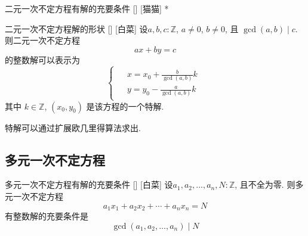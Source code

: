 \documentclass[UTF8]{ctexart}
\begin{document}
            \begin{thm}
                []
                {二元一次不定方程有解的充要条件}
                []
                [猫猫]
                *
            \end{thm}
            
            \begin{thm}
                [typeofsolutionoflinearDiophantineEquation]
                {二元一次不定方程解的形状}
                []
                [白菜]
                设\(a, b, c:\mathbb{Z}\), \(a\neq 0\), \(b\neq 0\), 且 \(\gcd(a,b)\mid c\). 则二元一次不定方程
                \[ax+by=c\]
                的整数解可以表示为
                \[
                    \begin{cases}
                    \begin{aligned}
                        &x=x_0+\frac{b}{\gcd(a,b)}k\\
                        &y=y_0-\frac{a}{\gcd(a,b)}k
                    \end{aligned}
                    \end{cases}         
                \]
                其中 \(k\in\mathbb{Z}\), \((x_0, y_0)\) 是该方程的一个特解.                    
                
            \end{thm}

            \begin{rmk}
                    特解可以通过扩展欧几里得算法求出.
            \end{rmk}

        \subsection{多元一次不定方程}
            
            \begin{thm}
                [conditionofsolvabilityofmultivariablelineardiophantineequation]
                {多元一次不定方程有解的充要条件}
                []
                [白菜]
                设\(a_1, a_2, \ldots, a_n, N:\mathbb{Z}\), 且不全为零. 则多元一次不定方程
                \[a_1x_1+a_2x_2+\cdots+a_nx_n=N\]
                有整数解的充要条件是
                \[\gcd(a_1, a_2, \ldots, a_n)\mid N\]
            \end{thm}
\end{document}
